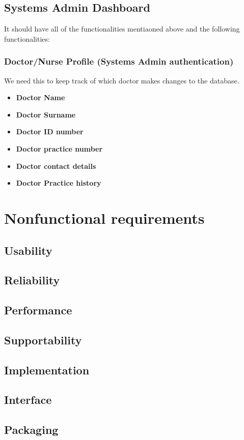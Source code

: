 \documentclass[12pt]{article}
\begin{document}
\subsection{Systems Admin Dashboard}
It should have all of the functionalities mentiaoned above and the following functionalities:
\subsubsection{Doctor/Nurse Profile (Systems Admin authentication)}
We need this to keep track of which doctor makes changes to the database.
\begin{itemize}
\item \textbf{Doctor Name}
\item \textbf{Doctor Surname}
\item \textbf{Doctor ID number}
\item \textbf{Doctor practice number}
\item \textbf{Doctor contact details}
\item \textbf{Doctor Practice history}
\end{itemize}
\section{Nonfunctional requirements}
\subsection{Usability}
\subsection{Reliability}
\subsection{Performance}
\subsection{Supportability}
\subsection{Implementation}
\subsection{Interface}
\subsection{Packaging}
\end{document}
